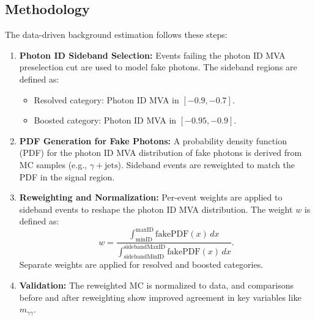 \subsection{Methodology}
The data-driven background estimation follows these steps:
\begin{enumerate}
    \item \textbf{Photon ID Sideband Selection:}
    Events failing the photon ID MVA preselection cut are used to model fake photons.
    The sideband regions are defined as:
    \begin{itemize}
        \item Resolved category: Photon ID MVA in \([-0.9, -0.7]\).
        \item Boosted category: Photon ID MVA in \([-0.95, -0.9]\).
    \end{itemize}

    \item \textbf{PDF Generation for Fake Photons:}
    A probability density function (PDF) for the photon ID MVA distribution of fake photons is
    derived from MC samples (e.g., \(\gamma + \text{jets}\)).
    Sideband events are reweighted to match the PDF in the signal region.

    \item \textbf{Reweighting and Normalization:}
    Per-event weights are applied to sideband events to reshape the photon ID MVA distribution.
    The weight \(w\) is defined as:
    \[
        w = \frac{\int_{\text{minID}}^{\text{maxID}} \text{fakePDF}(x) \, dx}
                 {\int_{\text{sidebandMinID}}^{\text{sidebandMaxID}} \text{fakePDF}(x) \, dx}.
    \]
    Separate weights are applied for resolved and boosted categories.

    \item \textbf{Validation:}
    The reweighted MC is normalized to data, and comparisons before and after reweighting show improved agreement in key variables like \(m_{\gamma\gamma}\).
\end{enumerate}

